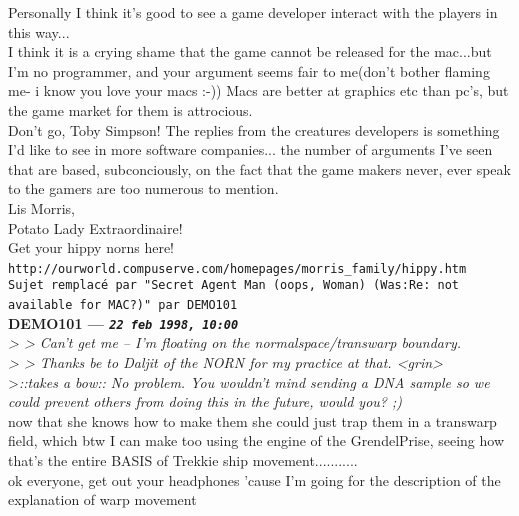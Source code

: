 \documentclass[11pt,twoside,a4paper]{article}
\begin{document}
\begin{multicols*}{2}
Personally I think it's good to see a game developer interact with the players in this way...~\\
I think it is a crying shame that the game cannot be released for the mac...but I'm no programmer, and your argument seems fair to me(don't bother flaming me- i know you love your macs :-)) Macs are better at graphics etc than pc's, but the game market for them is attrocious.~\\
Don't go, Toby Simpson! The replies from the creatures developers is something I'd like to see in more software companies... the number of arguments I've seen that are based, subconciously, on the fact that the game makers never, ever speak to the gamers are too numerous to mention.~\\

Lis Morris,~\\
Potato Lady Extraordinaire!~\\
Get your hippy norns here!~\\
\texttt{http://ourworld.compuserve.com/homepages/morris\_family/hippy.htm}~\\

 
		
	
		
\texttt{Sujet remplac{\'e} par "Secret Agent Man (oops, Woman) (Was:Re: not available for MAC?)" par DEMO101}~\\
		
	
		
\textbf{DEMO101 --- \emph{\texttt{22 feb 1998, 10:00}}}~\\

\emph{> > Can't get me -- I'm floating on the normalspace/transwarp boundary.}~\\
\emph{> > Thanks be to Daljit of the NORN for my practice at that.  <grin>}~\\

>\emph{::takes a bow::  No problem.  You wouldn't mind sending a DNA sample so we could prevent others from doing this in the future, would you?  ;)}~\\

now that she knows how to make them she could just trap them in a transwarp field, which btw I can make too using the engine of the GrendelPrise, seeing how that's the entire BASIS of Trekkie ship movement...........~\\

ok everyone, get out your headphones 'cause I'm going for the description of the explanation of warp movement~\\


\end{multicols*}
\end{document}
